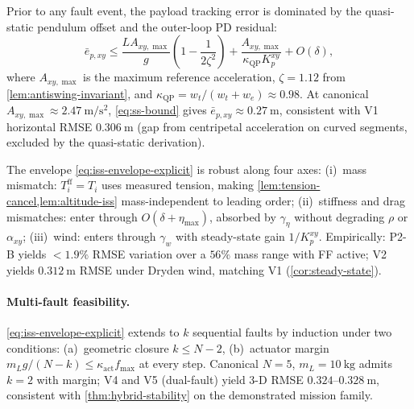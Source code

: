 \begin{corollary}
\label{cor:steady-state}
Prior to any fault event, the payload tracking error is
dominated by the quasi-static pendulum offset and the outer-loop
PD residual:
\begin{equation}
  \bar{e}_{p,xy} \le \frac{L A_{xy,\max}}{g}
    \left(1 - \frac{1}{2\zeta^2}\right)
    + \frac{A_{xy,\max}}{\kappa_{\mathrm{QP}} K_p^{xy}}
    + O(\delta),
  \label{eq:ss-bound}
\end{equation}
where $A_{xy,\max}$ is the maximum reference acceleration,
$\zeta = 1.12$ from \cref{lem:antiswing-invariant}, and
$\kappa_{\mathrm{QP}} = w_t/(w_t + w_e) \approx 0.98$. At
canonical $A_{xy,\max} \approx \SI{2.47}{\metre\per\second\squared}$,
\eqref{eq:ss-bound} gives $\bar{e}_{p,xy} \approx
\SI{0.27}{\metre}$, consistent with V1 horizontal RMSE
$\SI{0.306}{\metre}$ (gap from centripetal acceleration on
curved segments, excluded by the quasi-static derivation).
\end{corollary}

\begin{corollary}
\label{cor:robustness}
The envelope \eqref{eq:iss-envelope-explicit} is robust along four axes: (i)~mass mismatch: $T_i^{\mathrm{ff}} = T_i$ uses measured tension, making \cref{lem:tension-cancel,lem:altitude-iss} mass-independent to leading order; (ii)~stiffness and drag mismatches: enter through $O(\delta + \eta_{\max})$, absorbed by $\gamma_\eta$ without degrading $\rho$ or $\alpha_{xy}$; (iii)~wind: enters through $\gamma_w$ with steady-state gain $1/K_p^{xy}$. Empirically: P2-B yields $<1.9\%$ RMSE variation over a $56\%$ mass range with FF active; V2 yields $\SI{0.312}{\metre}$ RMSE under Dryden wind, matching V1 (\cref{cor:steady-state}).
\end{corollary}

\paragraph{Multi-fault feasibility.}
\eqref{eq:iss-envelope-explicit} extends to $k$ sequential
faults by induction under two conditions: (a)~geometric
closure $k \le N - 2$, (b)~actuator margin
$m_L g/(N{-}k) \le \kappa_{\mathrm{act}} f_{\max}$ at every
step. Canonical $N = 5$, $m_L = \SI{10}{\kilo\gram}$ admits
$k = 2$ with margin; V4 and V5 (dual-fault) yield
3-D RMSE $0.324$--$\SI{0.328}{\metre}$, consistent with
\cref{thm:hybrid-stability} on the demonstrated mission family.

